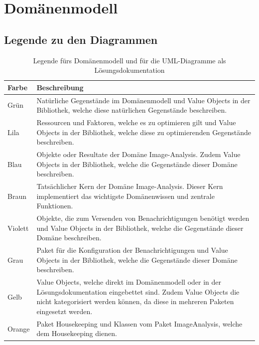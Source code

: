 


\section{Domänenmodell}
\subsection{Legende zu den Diagrammen}
\begin{table}[H]
	\centering	
	
	\begin{tabular}{ p{2cm}  p{12cm}  }
		
		\toprule[1pt]
		\rowcolor{maroon!30}	
		Farbe & Beschreibung \\
		
		\midrule
Grün \cellcolor[RGB]{204,235,197}&  Natürliche Gegenstände im Domänenmodell und Value Objects in der Bibliothek, welche diese natürlichen Gegenstände beschreiben. \\
Lila \cellcolor[RGB]{253,218,236} & Ressourcen und Faktoren, welche es zu optimieren gilt und Value Objects in der Bibliothek,  welche diese zu optimierenden Gegenstände beschreiben.\\
Blau\cellcolor[RGB]{179,205,227} &  Objekte oder Resultate der Domäne Image-Analysis. Zudem Value Objects in der Bibliothek, welche die Gegenstände dieser Domäne beschreiben. \\
Braun \cellcolor[RGB]{229,216,189}& Tatsächlicher Kern der Domäne Image-Analysis. Dieser Kern implementiert das wichtigste Domänenwissen und zentrale Funktionen.\\			
Violett \cellcolor[RGB]{222,203,228} & Objekte, die zum Versenden von Benachrichtigungen benötigt werden und Value Objects in der Bibliothek, welche die Gegenstände dieser Domäne beschreiben.\\
Grau\cellcolor[RGB]{242,242,242} &  Paket für die Konfiguration der Benachrichtigungen und Value Objects in der Bibliothek, welche die Gegenstände dieser Domäne beschreiben.\\		
Gelb \cellcolor[RGB]{255,255,204}& Value Objects, welche direkt im Domänenmodell oder in der Lösungsdokumentation eingebettet sind. Zudem Value Objects die nicht kategorisiert werden können, da diese in mehreren Paketen eingesetzt werden. \\		
Orange \cellcolor[RGB]{254,217,166} &  Paket Housekeeping und Klassen vom Paket ImageAnalysis, welche dem Housekeeping dienen. \\
		
		\bottomrule
		
	\end{tabular}
	\caption{Legende fürs Domänenmodell und für die UML-Diagramme als Lösungsdokumentation}
	\label{tab: Legende fürs Domänenmodell und für die UML-Diagramme als Lösungsdokumentation}
\end{table}

